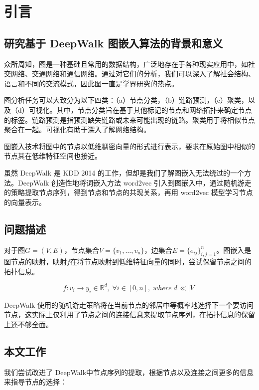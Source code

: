\documentclass{ctexart}
\begin{document}


\tableofcontents
\newpage

\section{引言}

\subsection{研究基于 DeepWalk 图嵌入算法的背景和意义}

众所周知，图是一种基础且常用的数据结构，广泛地存在于各种现实应用中，如社交网络、交通网络和通信网络。通过对它们的分析，我们可以深入了解社会结构、语言和不同的交流模式，因此图一直是学界研究的热点。

图分析任务可以大致分为以下四类：（a）节点分类，（b）链路预测，（c）聚类，以及（d）可视化\cite{goyal2018graph}。其中，节点分类旨在基于其他标记的节点和网络拓扑来确定节点的标签。链路预测是指预测缺失链路或未来可能出现的链路。聚类用于将相似节点聚合在一起。可视化有助于深入了解网络结构。

图嵌入技术将图中的节点以低维稠密向量的形式进行表示，要求在原始图中相似的节点其在低维特征空间也接近。

虽然 DeepWalk 是 KDD 2014 的工作，但却是我们了解图嵌入无法绕过的一个方法。DeepWalk 创造性地将词嵌入方法 word2vec 引入到图嵌入中，通过随机游走的策略提取节点序列，得到节点和节点的共现关系，再用 word2vec 模型学习节点的向量表示。

\subsection{问题描述}

对于图$G=(V,E)$，节点集合$V=\{v_1,\dots,v_n\}$，边集合$ E=\{ e_{ij} \}_{i,j=1}^n $。图嵌入是图节点的映射，映射$f$在将节点映射到低维特征向量的同时，尝试保留节点之间的拓扑信息。

$$
f:v_i \to y_i \in \mathbb{R}^d, \;\forall i \in[0,n],\;where\; d \ll |V|
$$

DeepWalk 使用的随机游走策略将在当前节点的邻居中等概率地选择下一个要访问节点，这实际上仅利用了节点之间的连接信息来提取节点序列，在拓扑信息的保留上还不够全面。

\subsection{本文工作}

我们尝试改进了 DeepWalk中节点序列的提取，根据节点以及连接之间更多的信息来指导节点的选择：
\end{document}
